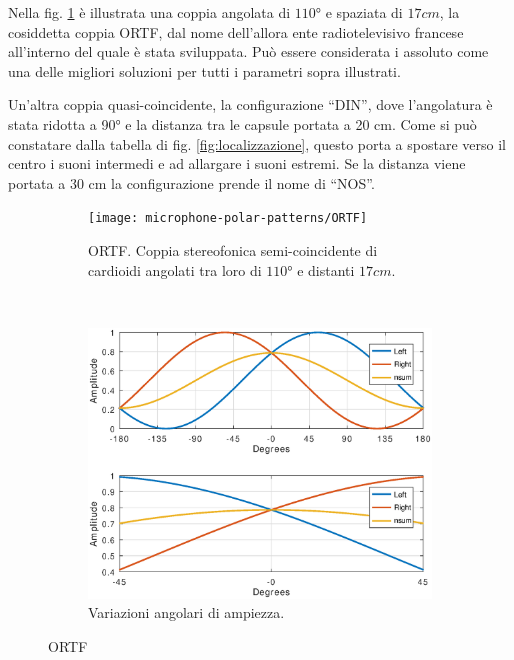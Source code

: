 Nella fig. \ref{pol:ortfsp} è illustrata una coppia angolata di $110°$ e spaziata
di $17cm$, la cosiddetta coppia ORTF, dal nome dell’allora ente radiotelevisivo
francese all’interno del quale è stata sviluppata. Può essere considerata i
assoluto come una delle migliori soluzioni per tutti i parametri sopra illustrati.

Un’altra coppia quasi-coincidente, la configurazione “DIN”, dove l’angolatura
è stata ridotta a 90° e la distanza tra le capsule portata a 20 cm. Come si può
constatare dalla tabella di fig. \ref{fig:localizzazione}, questo porta a
spostare verso il centro i suoni intermedi e ad allargare i suoni estremi.
Se la distanza viene portata a 30 cm la configurazione prende il nome di “NOS”.

\clearpage

\begin{figure}[t]
    \centering
    \begin{subfigure}[t]{0.99\textwidth}
        \centering
        \texttt{[image: microphone-polar-patterns/ORTF]}
        \caption[]{ORTF. Coppia stereofonica semi-coincidente di cardioidi angolati tra loro di $110°$ e distanti $17cm$.}%
        \label{pol:ortfsp}
    \end{subfigure}%
    \\
    \begin{subfigure}[t]{0.99\textwidth}
        \centering
        \includegraphics[width=12.5cm]{CAPITOLI/0300/IMG/ortfsub}
        \caption[]{Variazioni angolari di ampiezza.}%
        \label{plot:ortf}
    \end{subfigure}
    \caption[]{ORTF}
    \label{sp:ortf}
\end{figure}

